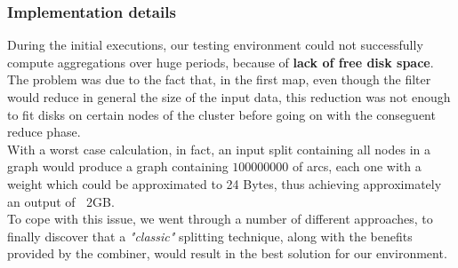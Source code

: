 \subsubsection{Implementation details}
During the initial executions, our testing environment
could not successfully compute aggregations over huge periods, because of \textbf{lack of free disk space}. \\
The problem was due to the fact that, in the first map, even though the filter would reduce in general the size of the input data,
this reduction was not enough to fit disks on certain nodes of the cluster before going on with the conseguent reduce phase.\\
With a worst case calculation, in fact, an input split containing all nodes in a graph would produce a graph containing $100000000$ of arcs, each one with a weight which could be approximated to 24 Bytes, thus achieving approximately an output of $~$ 2GB. \\
To cope with this issue, we went through a number of different approaches, to finally discover that a \emph{"classic"} splitting technique, along with the benefits provided by the combiner, would result in the best solution for our environment.
